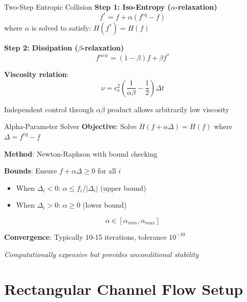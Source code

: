 \documentclass[aspectratio=169]{beamer}
\begin{document}
\begin{frame}{Two-Step Entropic Collision}
\textbf{Step 1: Iso-Entropy ($\alpha$-relaxation)}
$$f^* = f + \alpha(f^{eq} - f)$$
where $\alpha$ is solved to satisfy: $H(f^*) = H(f)$

\vspace{0.5cm}
\textbf{Step 2: Dissipation ($\beta$-relaxation)}
$$f^{new} = (1-\beta)f + \beta f^*$$

\vspace{0.5cm}
\textbf{Viscosity relation}:
$$\nu = c_s^2\left(\frac{1}{\alpha\beta} - \frac{1}{2}\right)\Delta t$$

Independent control through $\alpha\beta$ product allows arbitrarily low viscosity
\end{frame}

\begin{frame}{Alpha-Parameter Solver}
\textbf{Objective}: Solve $H(f + \alpha\Delta) = H(f)$ where $\Delta = f^{eq} - f$

\vspace{0.3cm}
\textbf{Method}: Newton-Raphson with bound checking

\vspace{0.3cm}
\textbf{Bounds}: Ensure $f + \alpha\Delta \geq 0$ for all $i$
\begin{itemize}
    \item When $\Delta_i < 0$: $\alpha \leq f_i/|\Delta_i|$ (upper bound)
    \item When $\Delta_i > 0$: $\alpha \geq 0$ (lower bound)
\end{itemize}

$$\alpha \in [\alpha_{min}, \alpha_{max}]$$

\vspace{0.3cm}
\textbf{Convergence}: Typically 10-15 iterations, tolerance $10^{-10}$

\vspace{0.3cm}
\textit{Computationally expensive but provides unconditional stability}
\end{frame}

\section{Rectangular Channel Flow Setup}
\end{document}
